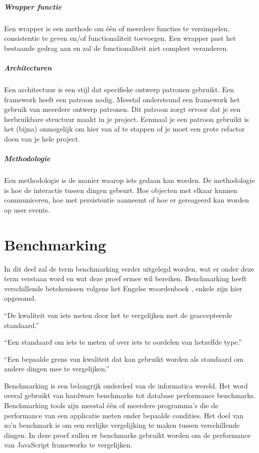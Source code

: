 \subparagraph{Wrapper functie}
\label{sec:Frameworks_Wrapper_Functie}
Een wrapper is een methode om één of meerdere functies te versimpelen, consistentie te geven en/of functionaliteit toevoegen. Een wrapper past het bestaande gedrag aan en zal de functionaliteit niet compleet veranderen.

\subparagraph{Architecturen}
\label{sec:Frameworks_Architecturen}
Een architectuur is een stijl dat specifieke ontwerp patronen gebruikt. Een framework heeft een patroon nodig. Meestal ondersteund een framework het gebruik van meerdere ontwerp patronen. Dit patroon zorgt ervoor dat je een herbruikbare structuur maakt in je project. Eenmaal je een patroon gebruikt is het (bijna) onmogelijk om hier van af te stappen of je moet een grote refactor doen van je hele project.

\subparagraph{Methodologie}
\label{sec:Frameworks_Methodologie}
Een methodologie is de manier waarop iets gedaan kan worden. De methodologie is hoe de interactie tussen dingen gebeurt. Hoe objecten met elkaar kunnen communiceren, hoe met persistentie aanneemt of hoe er gereageerd kan worden op user events.

\section{Benchmarking}
\label{sec:Benchmarking}

In dit deel zal de term benchmarking verder uitgelegd worden, wat er onder deze term verstaan word en wat deze proef ermee wil bereiken. Benchmarking heeft verschillende betekenissen volgens het Engelse woordenboek \textcite{_benchmark_????}, enkele zijn hier opgesomd.

“De kwaliteit van iets meten door het te vergelijken met de geaccepteerde standaard.”

“Een standaard om iets te meten of over iets te oordelen van hetzelfde type.”

“Een bepaalde grens van kwaliteit dat kan gebruikt worden als standaard om andere dingen mee te vergelijken.”

Benchmarking is een belangrijk onderdeel van de informatica wereld. Het word overal gebruikt van hardware benchmarks tot database performance benchmarks. Benchmarking tools zijn meestal één of meerdere programma’s die de performance van een applicatie meten onder bepaalde condities. Het doel van zo’n benchmark is om een eerlijke vergelijking te maken tussen verschillende dingen. In deze proef zullen er benchmarks gebruikt worden om de performance van JavaScript frameworks te vergelijken.


